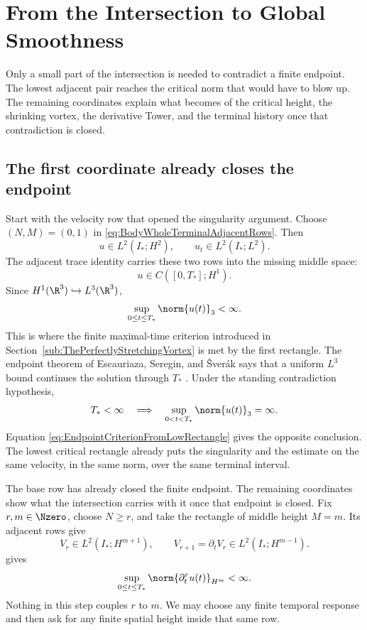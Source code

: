 \clearpage
\section{From the Intersection to Global Smoothness}\label{sec:TheMissingEstimateAndGlobalSmoothness}

Only a small part of the intersection is needed to contradict a finite endpoint.
The lowest adjacent pair reaches the critical norm that would have to blow up.
The remaining coordinates explain what becomes of the critical height, the shrinking vortex, the derivative Tower, and the terminal history once that contradiction is closed.

\subsection{The first coordinate already closes the endpoint}\label{sub:FromFiniteRectanglesToClassicalEstimates}

Start with the velocity row that opened the singularity argument.  Choose
\((N,M)=(0,1)\) in \eqref{eq:BodyWholeTerminalAdjacentRows}.  Then
\[
  u\in L^2(I_*;H^2),
  \qquad
  u_t\in L^2(I_*;L^2).
\]
The adjacent trace identity carries these two rows into the missing middle space:
\[
  u\in C([0,T_*];H^1).
\]
Since \(H^1(\R^3)\hookrightarrow L^3(\R^3)\),
\begin{equation}\label{eq:EndpointCriterionFromLowRectangle}
  \sup_{0\leq t\leq T_*}\norm{u(t)}_3<\infty.
\end{equation}
This is where the finite maximal-time criterion introduced in Section~\ref{sub:ThePerfectlyStretchingVortex} is met by the first rectangle.
The endpoint theorem of Escauriaza, Seregin, and \v{S}ver\'ak says that a uniform
\(L^3\) bound continues the solution through \(T_*\)
\parencite{EscauriazaSereginSverak2003}.  Under the standing contradiction hypothesis,
\begin{equation}\label{eq:FiniteTimeLThreeEscape}
  T_*<\infty
  \quad\Longrightarrow\quad
  \sup_{0<t<T_*}\norm{u(t)}_3=\infty.
\end{equation}
Equation \eqref{eq:EndpointCriterionFromLowRectangle} gives the opposite conclusion.
The lowest critical rectangle already puts the singularity and the estimate on the
same velocity, in the same norm, over the same terminal interval.

The base row has already closed the finite endpoint.  The remaining coordinates show
what the intersection carries with it once that endpoint is closed.  Fix
\(r,m\in\Nzero\), choose \(N\geq r\), and take the rectangle of middle height
\(M=m\).  Its adjacent rows give
\[
  V_r\in L^2(I_*;H^{m+1}),
  \qquad
  V_{r+1}=\partial_tV_r\in L^2(I_*;H^{m-1}).
\]
 gives
\begin{equation}\label{eq:BodyUniformMixedSobolevCoordinate}
  \sup_{0\leq t\leq T_*}
  \norm{\partial_t^ru(t)}_{H^m}
  <\infty.
\end{equation}
Nothing in this step couples \(r\) to \(m\).  We may choose any finite temporal
response and then ask for any finite spatial height inside that same row.

